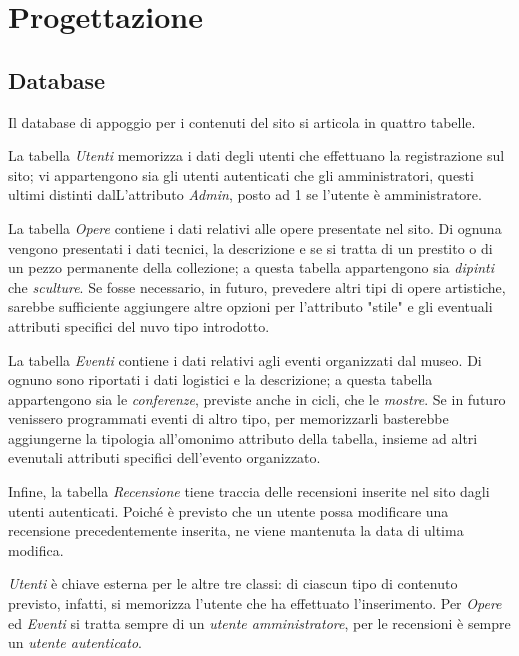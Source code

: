 \section{Progettazione}
\label{progettazione}

\subsection{Database}
\label{progettazione-database}
Il database di appoggio per i contenuti del sito si articola in quattro tabelle. 

La tabella \textit{Utenti} memorizza i dati degli utenti che effettuano la registrazione sul sito; vi appartengono sia gli utenti autenticati che gli amministratori, questi ultimi distinti dalL'attributo \textit{Admin}, posto ad 1 se l'utente è amministratore.

La tabella \textit{Opere} contiene i dati relativi alle opere presentate nel sito. Di ognuna vengono presentati i dati tecnici, la descrizione e se si tratta di un prestito o di un pezzo permanente della collezione; a questa tabella appartengono sia \textit{dipinti} che \textit{sculture}. Se fosse necessario, in futuro, prevedere altri tipi di opere artistiche, sarebbe sufficiente aggiungere altre opzioni per l'attributo "stile" e gli eventuali attributi specifici del nuvo tipo introdotto.

La tabella \textit{Eventi} contiene i dati relativi agli eventi organizzati dal museo. Di ognuno sono riportati i dati logistici e la descrizione; a questa tabella appartengono sia le \textit{conferenze}, previste anche in cicli, che le \textit{mostre}. Se in futuro venissero programmati eventi di altro tipo, per memorizzarli basterebbe aggiungerne la tipologia all'omonimo attributo della tabella, insieme ad altri evenutali attributi specifici dell'evento organizzato.

Infine, la tabella \textit{Recensione} tiene traccia delle recensioni inserite nel sito dagli utenti autenticati. Poiché è previsto che un utente possa modificare una recensione precedentemente inserita, ne viene mantenuta la data di ultima modifica.

\textit{Utenti} è chiave esterna per le altre tre classi: di ciascun tipo di contenuto previsto, infatti, si memorizza l'utente che ha effettuato l'inserimento. Per \textit{Opere} ed \textit{Eventi} si tratta sempre di un \textit{utente amministratore}, per le recensioni è sempre un \textit{utente autenticato}.


